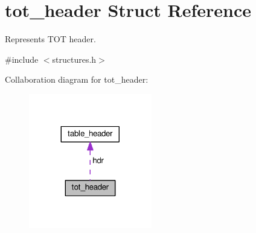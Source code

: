 \hypertarget{structtot__header}{}\section{tot\+\_\+header Struct Reference}
\label{structtot__header}


Represents T\+OT header.  




{\ttfamily \#include $<$structures.\+h$>$}



Collaboration diagram for tot\+\_\+header\+:\nopagebreak
\begin{figure}[H]
\begin{center}
\leavevmode
\includegraphics[width=152pt]{structtot__header__coll__graph}
\end{center}
\end{figure}

